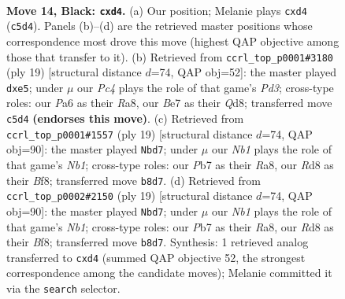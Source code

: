 \documentclass[11pt]{article}
\begin{document}
\clearpage

\begin{figure}[p]\centering
\begin{subfigure}{0.46\textwidth}\centering
\resizebox{\linewidth}{!}{%
\newchessgame
\chessboard[
  setfen={rnbr2k1/1p2bppp/pn1qp3/2p5/2pP2N1/1P2B1P1/P3PPBP/RN1QRK2 b - - 0 14},
  showmover=false,
  pgfstyle=straightmove, color=movearrow, markmove={c5-d4}
]}
\caption{}
\end{subfigure}\hfill
\begin{subfigure}{0.46\textwidth}\centering
\resizebox{\linewidth}{!}{%
\newchessgame
\chessboard[
  setfen={r1bq1rk1/2p1bppp/p1np1n2/4P3/Pp2P3/1B3N2/1PP2PPP/RNBQR1K1 b - - 0 10},
  showmover=false,
  pgfstyle=straightmove, color=movearrow, markmove={d6-e5}
]}
\caption{}
\end{subfigure}
\\[4pt]
\begin{subfigure}{0.46\textwidth}\centering
\resizebox{\linewidth}{!}{%
\newchessgame
\chessboard[
  setfen={rn1qkb1r/1b3ppp/pp2pn2/2p5/3P4/P1NBPN2/1P2QPPP/R1B2RK1 b kq - 1 10},
  showmover=false,
  pgfstyle=straightmove, color=movearrow, markmove={b8-d7}
]}
\caption{}
\end{subfigure}\hfill
\begin{subfigure}{0.46\textwidth}\centering
\resizebox{\linewidth}{!}{%
\newchessgame
\chessboard[
  setfen={rn1qkb1r/1b3ppp/pp2pn2/2p5/3P4/P1NBPN2/1P2QPPP/R1B2RK1 b kq - 1 10},
  showmover=false,
  pgfstyle=straightmove, color=movearrow, markmove={b8-d7}
]}
\caption{}
\end{subfigure}
\caption{\textbf{Move 14, Black: \texttt{cxd4}.} (a) Our position; Melanie plays \texttt{cxd4} (\texttt{c5d4}). Panels (b)--(d) are the retrieved master positions whose correspondence most drove this move (highest QAP objective among those that transfer to it). (b) Retrieved from \texttt{ccrl\_top\_p0001\#3180} (ply 19) [structural distance $d$=74, QAP obj=52]: the master played \texttt{dxe5}; under $\mu$ our \emph{Pc4} plays the role of that game's \emph{Pd3}; cross-type roles: our \emph{P}a6 as their \emph{R}a8, our \emph{B}e7 as their \emph{Q}d8; transferred move \texttt{c5d4} \textbf{(endorses this move)}. (c) Retrieved from \texttt{ccrl\_top\_p0001\#1557} (ply 19) [structural distance $d$=74, QAP obj=90]: the master played \texttt{Nbd7}; under $\mu$ our \emph{Nb1} plays the role of that game's \emph{Nb1}; cross-type roles: our \emph{P}b7 as their \emph{R}a8, our \emph{R}d8 as their \emph{B}f8; transferred move \texttt{b8d7}. (d) Retrieved from \texttt{ccrl\_top\_p0002\#2150} (ply 19) [structural distance $d$=74, QAP obj=90]: the master played \texttt{Nbd7}; under $\mu$ our \emph{Nb1} plays the role of that game's \emph{Nb1}; cross-type roles: our \emph{P}b7 as their \emph{R}a8, our \emph{R}d8 as their \emph{B}f8; transferred move \texttt{b8d7}. Synthesis: 1 retrieved analog transferred to \texttt{cxd4} (summed QAP objective 52, the strongest correspondence among the candidate moves); Melanie committed it via the \texttt{search} selector.}
\label{fig:thought-m27}
\end{figure}
\end{document}
